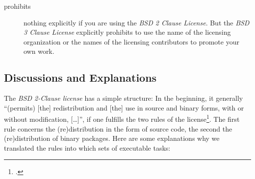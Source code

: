 \begin{description}
\item[prohibits] nothing explicitly if you are using the \emph{BSD 2 Clause
License}. But the \emph{BSD 3 Clause License} explicitly prohibits to use the
name of the licensing organization or the names of the licensing contributors to
promote your own work.

\end{description}

\subsection{Discussions and Explanations}

The \textit{BSD 2-Clause license} has a simple structure: In the
beginning, it generally \enquote{(permits) [the] redistribution and [the] use in
source and binary forms, with or without modification, [\ldots]}, if one
fulfills the two rules of the license\footcite[cf.][\nopage
wp]{BsdLicense2Clause}. The first rule concerns the (re)distribution in the form of
source code, the second the (re)distribution of binary packages. Here are some
explanations why we translated the rules into which sets of executable tasks:

